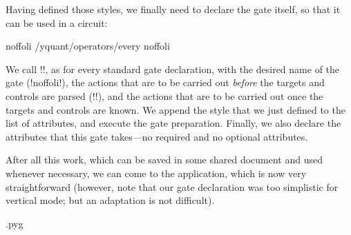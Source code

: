 \documentclass{scrartcl}
\makeatletter
\newenvironment{codeexample}{%
   \VerbatimEnvironment%
   \let\FVB@VerbatimOut\minted@FVB@VerbatimOut
   \let\FVE@VerbatimOut\minted@FVE@VerbatimOut
   \minted@configlang{tex}%
   \minted@fvset
   \begin{VerbatimOut}[codes={\catcode`\^^I=12},firstline,lastline]{\minted@jobname.pyg}%
}{
   \end{VerbatimOut}%
   \minted@langlinenoson%
   \savebox\codeexamplebox{ \minted@jobname.pyg}%
   \ifdim\wd\codeexamplebox>\dimexpr.5\linewidth-3mm\relax%
      \wd\codeexamplebox=.5\linewidth%
   \else%
      \wd\codeexamplebox=\dimexpr\wd\codeexamplebox+3mm\relax%
   \fi%
   \noindent\begin{minipage}{\wd\codeexamplebox}%
      \centering%
      \usebox\codeexamplebox%
   \end{minipage}%
   \begin{minipage}{\dimexpr\linewidth-\wd\codeexamplebox\relax}%
      \expandafter\minted@pygmentize\expandafter{\minted@lang}%
   \end{minipage}%
   \minted@langlinenosoff%
   \par%
}
\newenvironment{codeexample*}{%
   \VerbatimEnvironment%
   \let\FVB@VerbatimOut\minted@FVB@VerbatimOut
   \let\FVE@VerbatimOut\minted@FVE@VerbatimOut
   \minted@configlang{tex}%
   \minted@fvset
   \begin{VerbatimOut}[codes={\catcode`\^^I=12},firstline,lastline]{\minted@jobname.pyg}%
}{
   \end{VerbatimOut}%
   \minted@langlinenoson%
   \begin{adjustbox}{center}
       \minted@jobname.pyg %
   \end{adjustbox}\nopagebreak
   \expandafter\minted@pygmentize\expandafter{\minted@lang}%
   \minted@langlinenosoff%
   \par%
}
\makeatother
\begin{document}
\begin{example}
               Having defined those styles, we finally need to declare the gate itself, so that it can be used in a circuit:
               \begin{codeexample*}
\yquant@langhelper@declare@command
   {noffoli}
   {}
   {%
      \appto{}%
      \yquant@prepare
         {}%
         {/yquant/operators/every noffoli}%
   }%
               \end{codeexample*}
               We call \tex!\yquant@langhelper@declare@command!, as for every standard gate declaration, with the desired name of the gate (\tex!{noffoli}!), the actions that are to be carried out \emph{before} the targets and controls are parsed (\tex!{}!), and the actions that are to be carried out once the targets and controls are known.
               We append the style that we just defined to the list of attributes, and execute the gate preparation.
               Finally, we also declare the attributes that this gate takes---no required and no optional attributes.

               After all this work, which can be saved in some shared document and used whenever necessary, we can come to the application, which is now very straightforward (however, note that our gate declaration was too simplistic for vertical mode; but an adaptation is not difficult).

               \begin{codeexample}
               \end{codeexample}
            \end{example}
\end{document}
